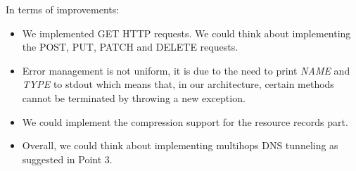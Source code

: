 \documentclass[a4paper, 11pt]{article}
\begin{document}
In terms of improvements:

\begin{itemize}

    \item We implemented GET HTTP requests. We could think about implementing the POST, PUT, PATCH and DELETE requests. 

    \item Error management is not uniform, it is due to the need to print \textit{NAME} and \textit{TYPE} to stdout which means that, in our architecture, certain methods cannot be terminated by throwing a new exception.

    \item We could implement the compression support for the resource records part.
    
    \item Overall, we could think about implementing multihops DNS tunneling as suggested in Point 3.
    
\end{itemize}
\end{document}
